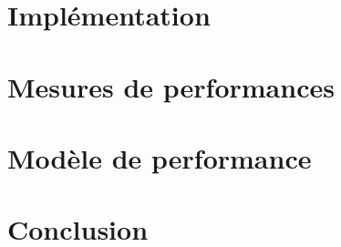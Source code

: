 \documentclass[12pt,a4paper]{report}
\begin{document}
\chapter{Implémentation}\label{title-implementation}


\chapter{Mesures de performances}\label{title-mesures_perf}


\chapter{Modèle de performance}\label{title-modele_perf}


\chapter{Conclusion}\label{title-conclusion}





\end{document}
